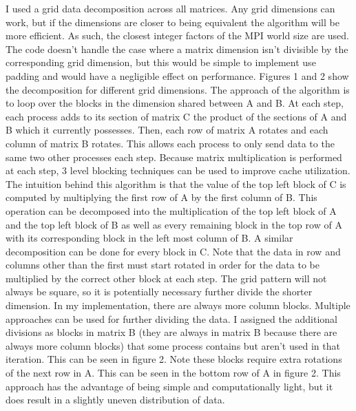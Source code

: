 \documentclass{article}
\begin{document}
I used a grid data decomposition across all matrices. Any grid dimensions can work, but if the
dimensions are closer to being equivalent the algorithm will be more efficient. As such, the closest
integer factors of the MPI world size are used. The code doesn't handle the case where a matrix
dimension isn't divisible by the corresponding grid dimension, but this would be simple to implement
use padding and would have a negligible effect on performance. Figures 1 and 2 show the decomposition
for different grid dimensions. The approach of the algorithm is to loop over the blocks 
in the dimension shared between A and B. At each step, each process adds to its section of matrix C the 
product of the sections of A and B which it currently possesses. Then, each row of matrix A rotates
and each column of matrix B rotates. This allows each process to only send data to the same two other
processes each step. Because matrix multiplication is performed at each step, 3 level blocking techniques
can be used to improve cache utilization. The intuition behind this algorithm is that the value of the top
left block of C is computed by multiplying the first row of A by the first column of B. This operation can
be decomposed into the multiplication of the top left block of A and the top left block of B as well as 
every remaining block in the top row of A with its corresponding block in the left most column of B.
A similar decomposition can be done for every block in C. Note that the data in row and columns other than the 
first must start rotated in order for the data to be multiplied by the correct other block at each step. 
The grid pattern will not always be square, so it is potentially necessary further divide the shorter dimension.
In my implementation, there are always more column blocks. Multiple approaches can be used for further 
dividing the data. I assigned the additional divisions as blocks in matrix B (they are always in matrix B
because there are always more column blocks) that some process contains but aren't used
in that iteration. This can be seen in figure 2. Note these blocks require extra rotations of the next
row in A. This can be seen in the bottom row of A in figure 2. This approach has the advantage of being
simple and computationally light, but it does result in a slightly uneven distribution of data. 
\end{document}

